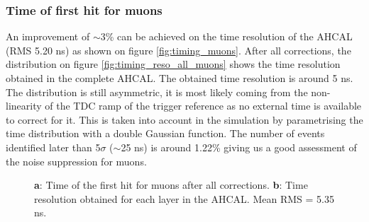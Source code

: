 \documentclass[twoside,a4paper,11pt]{article}
\begin{document}
\subsubsection{Time of first hit for muons}
\label{subsec:Muon_final}

An improvement of $\sim$3\% can be achieved on the time resolution of the AHCAL (RMS 5.20 ns) as shown on figure \ref{fig:timing_muons}. After all corrections, the distribution on figure \ref{fig:timing_reso_all_muons} shows the time resolution obtained in the complete AHCAL. The obtained time resolution is around 5 ns. The distribution is still asymmetric, it is most likely coming from the non-linearity of the TDC ramp of the trigger reference as no external time is available to correct for it. This is taken into account in the simulation by parametrising the time distribution with a double Gaussian function. The number of events identified later than 5$\sigma$ ($\sim$25 ns) is around 1.22\% giving us a good assessment of the noise suppression for muons.
\begin{figure}[htbp]
	\hfill
	\caption[]{\textbf{a}: Time of the first hit for muons after all corrections. \textbf{b}: Time resolution obtained for each layer in the AHCAL. Mean RMS = 5.35 ns.}
\end{figure}
\end{document}
